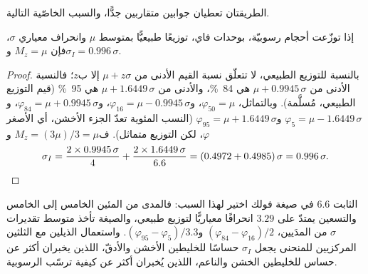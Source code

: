 الطريقتان تعطيان جوابين متقاربين جدًّا، والسبب الخاصّية التالية.

\begin{proposition}\label{prop:b1:clastic-sediments:normal}
إذا توزّعت أحجام رسوبيّة، بوحدات فاي، توزيعًا طبيعيًّا بمتوسط $\mu$ وانحراف معياري $\sigma$، فإن $M_z = \mu$ و$\sigma_I = 0.996\,\sigma$.
\end{proposition}

\begin{proof}
بالنسبة للتوزيع الطبيعي، لا تتعلّق نسبة القيم الأدنى من $\mu + z\sigma$ إلا ب$z$؛ فالنسبة الأدنى من $\mu + 0.9945\,\sigma$ هي \qty{84}{\percent}، والأدنى من $\mu + 1.6449\,\sigma$ هي \qty{95}{\percent} (قيم التوزيع الطبيعي، مُسلَّمة). وبالتماثل، $\varphi_{50} = \mu$، و$\varphi_{16} = \mu -
0.9945\,\sigma$، و$\varphi_{84} = \mu + 0.9945\,\sigma$، و$\varphi_5 = \mu -
1.6449\,\sigma$ و$\varphi_{95} = \mu + 1.6449\,\sigma$ (النسب المئوية تعدّ الجزء الأخشن، أي الأصغر $\varphi$، لكن التوزيع متماثل). ف$M_z = (3\mu)/3 = \mu$ و
\[
  \sigma_I = \frac{2 \times 0.9945\,\sigma}{4} + \frac{2 \times 1.6449\,\sigma}{6.6}
  = (0.4972 + 0.4985)\,\sigma = 0.996\,\sigma. \qedhere
\]
\end{proof}

الثابت 6.6 في صيغة فولك اختير لهذا السبب: فالمدى من المئين الخامس إلى الخامس والتسعين يمتدّ على $3.29$ انحرافًا معياريًّا لتوزيع طبيعي، والصيغة تأخذ متوسط تقديرات $\sigma$ من المدَيين، $(\varphi_{84}-\varphi_{16})/2$ و$(\varphi_{95}-\varphi_5)/3.3$. واستعمال الذيلين مع الثلثين المركزيين للمنحنى يجعل $\sigma_I$ حساسًا للخليطين الأخشن والأدقّ، اللذين يخبران أكثر عن
حساس للخليطين الخشن والناعم، اللذين يُخبران أكثر عن كيفية ترسّب الرسوبية.

